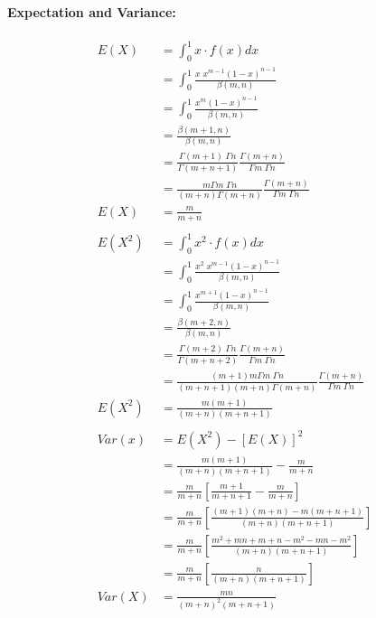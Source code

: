 \documentclass[
10pt, %
a4paper, %
]{report}
\begin{document}
\paragraph{Expectation and Variance:}
\begin{align*}
    E(X) &= \int_0^1 x \cdot f(x) dx \\
         &= \int_0^1 \frac{x\;x^{m-1}(1-x)^{n-1}}{\beta(m, n)} \\
         &= \int_0^1 \frac{x^{m}(1-x)^{n-1}}{\beta(m, n)} \\
         &= \frac{\beta(m+1, n)}{\beta(m, n)} \\
         &= \frac{\Gamma (m+1) \; \Gamma n}{\Gamma (m+n+1)} \frac{\Gamma (m+n)}{\Gamma m \; \Gamma n} \\
         &= \frac{m \Gamma m \; \Gamma n}{(m+n)\Gamma (m+n)} \frac{\Gamma (m+n)}{\Gamma m \; \Gamma n} \\
    E(X) &= \frac{m}{m+n} \\ \\
    E(X^2) &= \int_0^1 x^2 \cdot f(x) dx \\
         &= \int_0^1 \frac{x^2\;x^{m-1}(1-x)^{n-1}}{\beta(m, n)} \\
         &= \int_0^1 \frac{x^{m+1}(1-x)^{n-1}}{\beta(m, n)} \\
         &= \frac{\beta(m+2, n)}{\beta(m, n)} \\
         &= \frac{\Gamma (m+2) \; \Gamma n}{\Gamma (m+n+2)} \frac{\Gamma (m+n)}{\Gamma m \; \Gamma n} \\
         &= \frac{(m+1)m \Gamma m \; \Gamma n}{(m+n+1)(m+n)\Gamma (m+n)} \frac{\Gamma (m+n)}{\Gamma m \; \Gamma n} \\
    E(X^2) &= \frac{m(m+1)}{(m+n)(m+n+1)}  \\ \\
    Var(x) &= E(X^2) - [E(X)]^2 \\
           &= \frac{m(m+1)}{(m+n)(m+n+1)} - \frac{m}{m+n} \\
           &= \frac{m}{m+n}\left[\frac{m+1}{m+n+1}-\frac{m}{m+n}\right] \\
           &= \frac{m}{m+n}\left[\frac{(m+1)(m+n)-m(m+n+1)}{(m+n)(m+n+1)}\right] \\
           &= \frac{m}{m+n}\left[\frac{m^2+mn+m+n-m^2-mn-m^2}{(m+n)(m+n+1)}\right] \\
           &= \frac{m}{m+n}\left[\frac{n}{(m+n)(m+n+1)}\right] \\
    Var(X) &= \frac{mn}{(m+n)^2(m+n+1)}
\end{align*}
\end{document}
